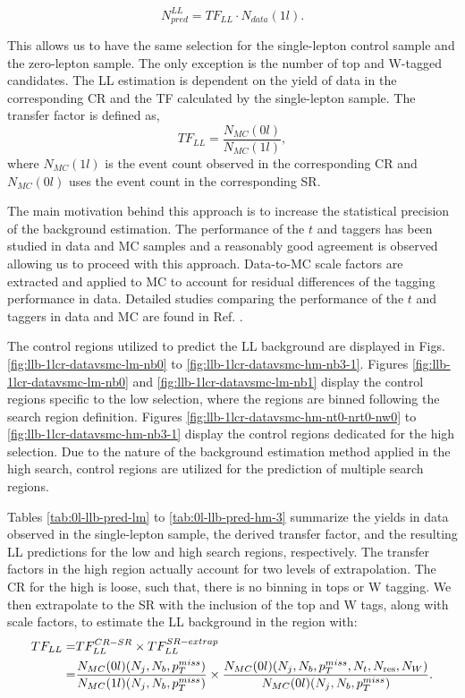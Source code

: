 \begin{equation}
\label{eqn:LLTF}
N_{pred}^{LL}=TF_{LL} \cdot N_{data}(1l).
\end{equation}

This allows us to have the same selection for the single-lepton control sample and the zero-lepton sample. The only exception is the number of top and W-tagged candidates. The LL estimation is dependent on the yield of data in the corresponding CR and the TF calculated by the single-lepton sample. The transfer factor is defined as, 
\begin{equation}
\label{eqn:TF}
TF_{LL}=\frac{N_{MC}(0l)}{N_{MC}(1l)},
\end{equation}
where $N_{MC}(1l)$ is the event count observed in the corresponding CR and $N_{MC}(0l)$ uses the event count in the corresponding SR. 

The main motivation behind this approach is to increase the statistical precision of the background estimation. The performance of the $t$ and \W{} taggers has been studied in data and MC samples and a reasonably good agreement is observed allowing us to proceed with this approach. Data-to-MC scale factors are extracted and applied to MC to account for residual differences of the tagging performance in data. Detailed studies comparing the performance of the $t$ and \W{} taggers in data and MC are found in Ref. \cite{cms_collaboration_search_2016}.

The control regions utilized to predict the LL background are displayed in Figs. \ref{fig:llb-1lcr-datavsmc-lm-nb0} to \ref{fig:llb-1lcr-datavsmc-hm-nb3-1}. Figures \ref{fig:llb-1lcr-datavsmc-lm-nb0} and \ref{fig:llb-1lcr-datavsmc-lm-nb1} display the control regions specific to the low \dm{} selection, where the regions are binned following the search region definition. Figures \ref{fig:llb-1lcr-datavsmc-hm-nt0-nrt0-nw0} to \ref{fig:llb-1lcr-datavsmc-hm-nb3-1} display the control regions dedicated for the high \dm{} selection. Due to the nature of the background estimation method applied in the high \dm{} search, control regions are utilized for the prediction of multiple search regions. 

Tables \ref{tab:0l-llb-pred-lm} to \ref{tab:0l-llb-pred-hm-3} summarize the yields in data observed in the single-lepton sample, the derived transfer factor, and the resulting LL predictions for the low \dm{} and high \dm{} search regions, respectively. The transfer factors in the high \dm{} region actually account for two levels of extrapolation. The CR for the high \dm{} is loose, such that, there is no binning in tops or W tagging. We then extrapolate to the SR with the inclusion of the top and W tags, along with scale factors, to estimate the LL background in the region with:
\begin{equation}\label{TFExtrapolation}
\begin{split}
TF_{LL}=& TF_{LL}^{CR-SR}\times TF_{LL}^{SR-extrap} \\
=& \frac{N_{MC}(0l)(N_{j},N_{b},p_{T}^{miss})}{N_{MC}(1l)(N_{j},N_{b},p_{T}^{miss})}\times\frac{N_{MC}(0l)(N_{j},N_{b},p_{T}^{miss},N_{t},N_{\text{res}},N_{W})}{N_{MC}(0l)(N_{j},N_{b},p_{T}^{miss})}.
\end{split}
\end{equation}

